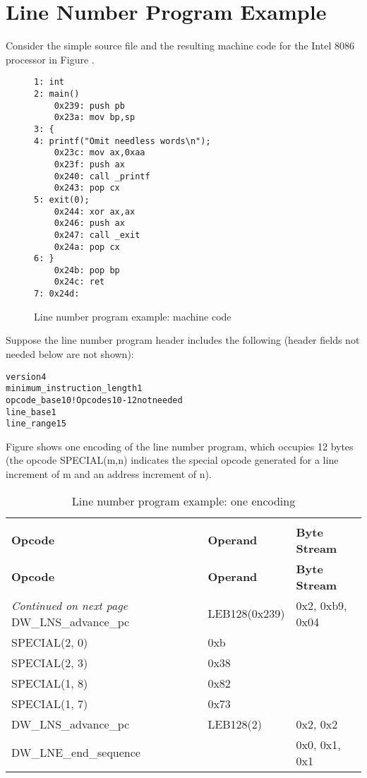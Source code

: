 \section{Line Number Program Example}
\label{app:linenumberprogramexample}

Consider the simple source file and the resulting machine
code for the Intel 8086 processor in 
Figure .

\begin{figure}[here]
\begin{lstlisting}
1: int
2: main()
    0x239: push pb
    0x23a: mov bp,sp
3: {
4: printf("Omit needless words\n");
    0x23c: mov ax,0xaa
    0x23f: push ax
    0x240: call _printf
    0x243: pop cx
5: exit(0);
    0x244: xor ax,ax
    0x246: push ax
    0x247: call _exit
    0x24a: pop cx
6: }
    0x24b: pop bp
    0x24c: ret
7: 0x24d:
\end{lstlisting}
\caption{Line number program example: machine code} \label{fig:linenumberprogramexamplemachinecode}
\end{figure}

Suppose the line number program header includes the following
(header fields not needed below are not shown):



\begin{alltt}
version                    4
minimum_instruction_length 1
opcode_base               10 ! Opcodes 10-12 not needed
line_base                  1
line_range                15
\end{alltt}


Figure 
shows one encoding of the line number program, which occupies
12 bytes (the opcode SPECIAL(m,n) indicates the special opcode
generated for a line increment of m and an address increment
of n).


\begin{centering}
\setlength{\extrarowheight}{0.1cm}
\begin{longtable}{lll}
  \caption{Line number program example: one encoding} \label{tab:linenumberprogramexampleoneencoding} \\
  \hline \\ \bfseries Opcode &\bfseries Operand &\bfseries Byte Stream \\ \hline
\endfirsthead
  \bfseries Opcode &\bfseries Operand &\bfseries Byte Stream\\ \hline
\endhead
  \hline \emph{Continued on next page}
\endfoot
  \hline
\endlastfoot
DW\-\_LNS\-\_advance\-\_pc&LEB128(0x239)&0x2, 0xb9, 0x04 \\
SPECIAL(2, 0)&0xb  & \\
SPECIAL(2, 3)&0x38 & \\
SPECIAL(1, 8)&0x82 & \\
SPECIAL(1, 7)&0x73 & \\
DW\-\_LNS\-\_advance\-\_pc&LEB128(2)&0x2, 0x2 \\
DW\-\_LNE\-\_end\-\_sequence &&0x0, 0x1, 0x1 \\
\end{longtable}
\end{centering}


